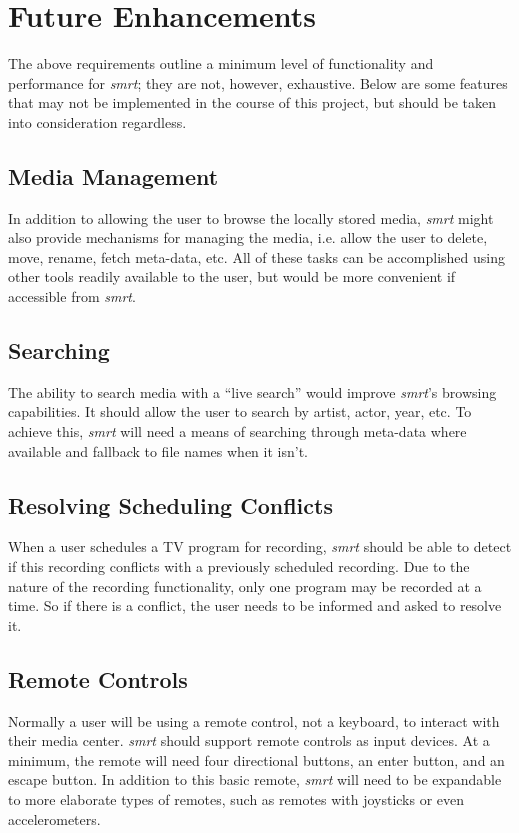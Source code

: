 \documentclass[letterpaper, titlepage, 11pt]{article}
\begin{document}
\section{Future Enhancements}
\label{sec:enhancements}
The above requirements outline a minimum level of functionality and performance
for \textit{smrt}; they are not, however, exhaustive. Below are some features
that may not be implemented in the course of this project, but should be taken
into consideration regardless.

\subsection{Media Management}
In addition to allowing the user to browse the locally stored media,
\textit{smrt} might also provide mechanisms for managing the media, i.e. allow
the user to delete, move, rename, fetch meta-data, etc. All of these tasks can
be accomplished using other tools readily available to the user, but would be
more convenient if accessible from \textit{smrt}.

\subsection{Searching}
The ability to search media with a ``live search'' would improve \textit{smrt}'s
browsing capabilities. It should allow the user to search by artist, actor,
year, etc. To achieve this, \textit{smrt} will need a means of searching through
meta-data where available and fallback to file names when it isn't.

\subsection{Resolving Scheduling Conflicts}
When a user schedules a TV program for recording, \textit{smrt} should be able
to detect if this recording conflicts with a previously scheduled recording. Due
to the nature of the recording functionality, only one program may be recorded
at a time. So if there is a conflict, the user needs to be informed and asked to
resolve it.

\subsection{Remote Controls}
Normally a user will be using a remote control, not a keyboard, to interact with
their media center. \textit{smrt} should support remote controls as input
devices. At a minimum, the remote will need four directional buttons, an enter
button, and an escape button. In addition to this basic remote, \textit{smrt}
will need to be expandable to more elaborate types of remotes, such as remotes
with joysticks or even accelerometers.
\end{document}
